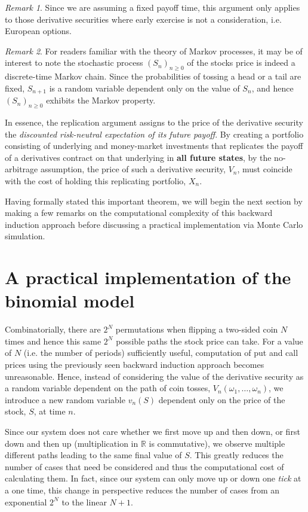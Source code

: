 \documentclass[]{article}
\theoremstyle{remark}
\newtheorem*{remark}{Remark}
\theoremstyle{plain}
\begin{document}
\begin{remark}
	Since we are assuming a fixed payoff time, this argument only applies to those derivative securities where early exercise is not a consideration, i.e. European options.
\end{remark}

\begin{remark}
	For readers familiar with the theory of Markov processes, it may be of interest to note the stochastic process $(S_n)_{n \geq 0}$ of the stocks price is indeed a discrete-time Markov chain. Since the probabilities of tossing a head or a tail are fixed, $S_{n+1}$ is a random variable dependent only on the value of $S_n$, and hence $(S_n)_{n \geq 0}$ exhibits the Markov property.
\end{remark}

In essence, the replication argument assigns to the price of the derivative security the \textit{discounted risk-neutral expectation of its future payoff}. By creating a portfolio consisting of underlying and money-market investments that replicates the payoff of a derivatives contract on that underlying in \textbf{all future states}, by the no-arbitrage assumption, the price of such a derivative security, $V_n$, must coincide with the cost of holding this replicating portfolio, $X_n$.

Having formally stated this important theorem, we will begin the next section by making a few remarks on the computational complexity of this backward induction approach before discussing a practical implementation via Monte Carlo simulation.

\section{A practical implementation of the binomial model}

Combinatorially, there are $2^{N}$ permutations when flipping a two-sided coin $N$ times and hence this same $2^{N}$ possible paths the stock price can take. For a value of $N$ (i.e. the number of periods) sufficiently useful, computation of put and call prices using the previously seen backward induction approach becomes unreasonable. Hence, instead of considering the value of the derivative security as a random variable dependent on the path of coin tosses, $V_{n}(\omega_{1},\ldots, \omega_{n})$, we introduce a new random variable $v_{n}(S)$ dependent only on the price of the stock, $S$, at time $n$.

Since our system does not care whether we first move up and then down, or first down and then up (multiplication in $\mathbb{R}$ is commutative), we observe multiple different paths leading to the same final value of $S$. This greatly reduces the number of cases that need be considered and thus the computational cost of calculating them. In fact, since our system can only move up or down one \textit{tick} at a one time, this change in perspective reduces the number of cases from an exponential $2^{N}$ to the linear $N+1$.
\end{document}
